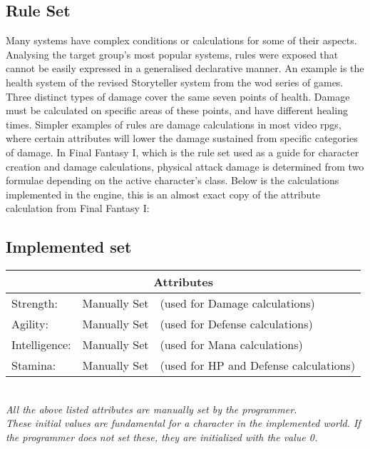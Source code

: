 \subsection{\langname{} Rule Set}
\label{language:ruleset}
Many systems have complex conditions or calculations for some of their aspects.
Analysing the target group's most popular systems, rules were exposed that cannot be easily expressed in a generalised declarative manner.
An example is the health system of the revised Storyteller system from the \ac{wod} series of games. Three distinct types of damage cover the same seven points of health. Damage must be calculated on specific areas of these points, and have different healing times.
Simpler examples of rules are damage calculations in most video \ac{rpgs},
where certain attributes will lower the damage sustained from specific categories of damage. In Final Fantasy I, which is the rule set used as a guide for character creation and damage calculations, physical attack damage is determined from two formulae depending on the active character's class. Below is the calculations implemented in the engine, this is an almost exact copy of the attribute calculation from Final Fantasy I:

\subsection{Implemented set}
\label{language:implset}
\begin{center}
\begin{tabular}{|l l l|}
\hline
\multicolumn{3}{|c|}{\textbf{Attributes}}\\
\hline
Strength: & Manually Set & (used for Damage calculations)\\
\hline
Agility: & Manually Set	 & (used for Defense calculations)\\
\hline
Intelligence: & Manually Set & (used for Mana calculations)\\
\hline
Stamina: & Manually Set & (used for HP and Defense calculations)\\
\hline
\end{tabular}\\
\emph{All the above listed attributes are manually set by the programmer.\\ These initial values are fundamental for a character in the implemented world. If the programmer does not set these, they are initialized with the value 0.}
\end{center}

